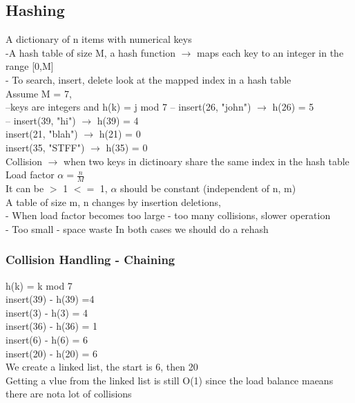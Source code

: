 \documentclass[12pt]{article}
\begin{document}
	\subsection*{Hashing}
	A dictionary of n items with numerical keys\\
	-A hash table of size M, a hash function $\rightarrow$ maps each key to an integer in the range [0,M]\\
	- To search, insert, delete look at the mapped index in a hash table\\
	
	Assume M = 7,\\
	--keys are integers and h(k) = j mod 7
	-- insert(26, "john") $\rightarrow$ h(26) = 5\\
	-- insert(39, "hi") $\rightarrow$ h(39) = 4\\
	insert(21, "blah") $\rightarrow$ h(21) = 0\\
	insert(35, "STFF") $\rightarrow$ h(35) = 0\\
	
	Collision $\rightarrow$ when two keys in dictinoary share the same index in the hash table
	Load factor $\alpha = \frac{n}{M}$\\
	It can be $>$ 1 $<=$ 1, $\alpha$ should be constant (independent of n, m)\\
	
	A table of size m, n changes by insertion deletions,\\
	- When load factor becomes too large - too many collisions, slower operation\\
	- Too small - space waste
	In both cases we should do a rehash\\
	
	\subsubsection*{Collision Handling - Chaining}
	h(k) = k mod 7\\
	insert(39) - h(39) =4\\
	insert(3) - h(3) = 4\\
	insert(36) - h(36) = 1\\
	insert(6) - h(6) = 6\\
	insert(20) - h(20) = 6\\
	
	We create a linked list, the start is 6, then 20\\
	Getting a vlue from the linked list is still O(1) since the load balance maeans there are nota lot of collisions\\
	
\end{document}
